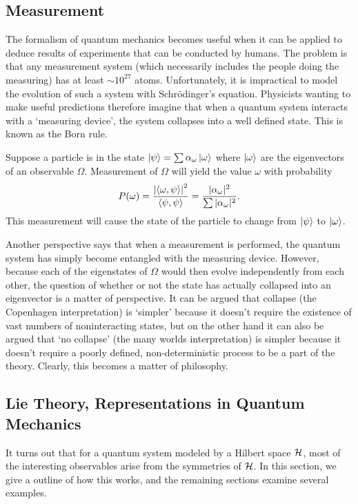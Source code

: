 \documentclass[a4paper]{article}
\begin{document}
\subsection{Measurement}
The formalism of quantum mechanics becomes useful when it can be applied to deduce results of experiments that can be conducted by humans. The problem is that any measurement system (which necessarily includes the people doing the measuring) has at least $\sim 10^{27}$ atoms. Unfortunately, it is impractical to model the evolution of such a system with Schr\"{o}dinger's equation. Physicists wanting to make useful predictions therefore imagine that when a quantum system interacts with a `measuring device', the system collapses into a well defined state. This is known as the Born rule.

\begin{princ}
    Suppose a particle is in the state $\left\lvert \psi \right\rangle = \sum \alpha_\omega \left\lvert \omega \right\rangle$ where $\left\lvert \omega \right\rangle$ are the eigenvectors of an observable $\Omega$. Measurement of $\Omega$ will yield the value $\omega$ with probability $$P(\omega) = \frac{\left\lvert \left\langle \omega , \psi \right\rangle \right\rvert^2}{\left\langle \psi , \psi \right\rangle} = \frac{|\alpha_\omega|^2}{\sum |\alpha_\omega|^2}.$$ This measurement will cause the state of the particle to change from $\left\lvert \psi \right\rangle$ to $\left\lvert \omega \right\rangle$.
\end{princ}

Another perspective says that when a measurement is performed, the quantum system has simply become entangled with the measuring device. However, because each of the eigenstates of $\Omega$ would then evolve independently from each other, the question of whether or not the state has actually collapsed into an eigenvector is a matter of perspective. It can be argued that collapse (the Copenhagen interpretation) is `simpler' because it doesn't require the existence of vast numbers of noninteracting states, but on the other hand it can also be argued that `no collapse' (the many worlds interpretation) is simpler because it doesn't require a poorly defined, non-deterministic process to be a part of the theory. Clearly, this becomes a matter of philosophy.

\subsection{Lie Theory, Representations in Quantum Mechanics}
It turns out that for a quantum system modeled by a Hilbert space $\mathcal{H}$, most of the interesting observables arise from the symmetries of $\mathcal{H}$. In this section, we give a outline of how this works, and the remaining sections examine several examples.
\end{document}
